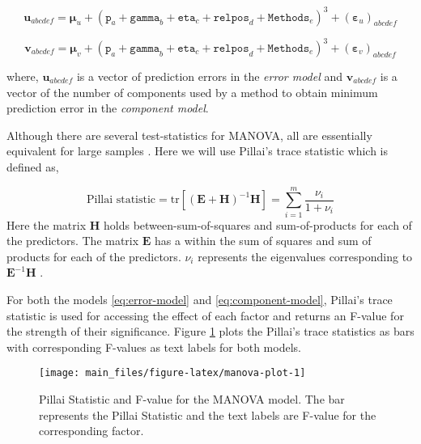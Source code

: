 \documentclass[review]{elsarticle}
\providecommand{\tightlist}{%
  \setlength{\itemsep}{0pt}\setlength{\parskip}{0pt}}
\begin{document}
\begin{description}
\tightlist
\item[\textbf{Error Model:}]
\begin{equation}\mathbf{u}_{abcdef} = \boldsymbol{\mu}_u +
  (\texttt{p}_a + \texttt{gamma}_b + \texttt{eta}_c +
\texttt{relpos}_d + \texttt{Methods}_e)^3 +
  \left(\boldsymbol{\varepsilon}_u\right)_{abcdef}
  \label{eq:error-model}
  \end{equation}
\item[\textbf{Component Model:}]
\begin{equation}\mathbf{v}_{abcdef} = \boldsymbol{\mu}_v +
  (\texttt{p}_a + \texttt{gamma}_b + \texttt{eta}_c +
\texttt{relpos}_d + \texttt{Methods}_e)^3 +
  \left(\boldsymbol{\varepsilon}_v\right)_{abcdef}
  \label{eq:component-model}
  \end{equation}
\end{description}

where, \(\mathbf{u}_{abcdef}\) is a vector of prediction errors in the \emph{error model} and \(\mathbf{v}_{abcdef}\) is a vector of the number of components used by a method to obtain minimum prediction error in the \emph{component model}.

Although there are several test-statistics for MANOVA, all are essentially equivalent for large samples \citep{johnson2018applied}. Here we will use Pillai's trace statistic which is defined as,

\begin{equation}
\text{Pillai statistic} = \text{tr}\left[
\left(\mathbf{E} + \mathbf{H}\right)^{-1}\mathbf{H}
\right] = \sum_{i=1}^m{\frac{\nu_i}{1 + \nu_i}}
\label{eq:pillai}
\end{equation}
Here the matrix \(\mathbf{H}\) holds between-sum-of-squares and sum-of-products for each of the predictors. The matrix \(\mathbf{E}\) has a within the sum of squares and sum of products for each of the predictors. \(\nu_i\) represents the eigenvalues corresponding to \(\mathbf{E}^{-1}\mathbf{H}\) \citep{rencher2003methods}.

For both the models \eqref{eq:error-model} and \eqref{eq:component-model}, Pillai's trace statistic is used for accessing the effect of each factor and returns an F-value for the strength of their significance. Figure \ref{fig:manova-plot} plots the Pillai's trace statistics as bars with corresponding F-values as text labels for both models.



\begin{figure}
\texttt{[image: main\_files/figure-latex/manova-plot-1]} \caption{Pillai Statistic and F-value for the MANOVA model. The bar represents the Pillai Statistic and the text labels are F-value for the corresponding factor.}\label{fig:manova-plot}
\end{figure}
\end{document}
